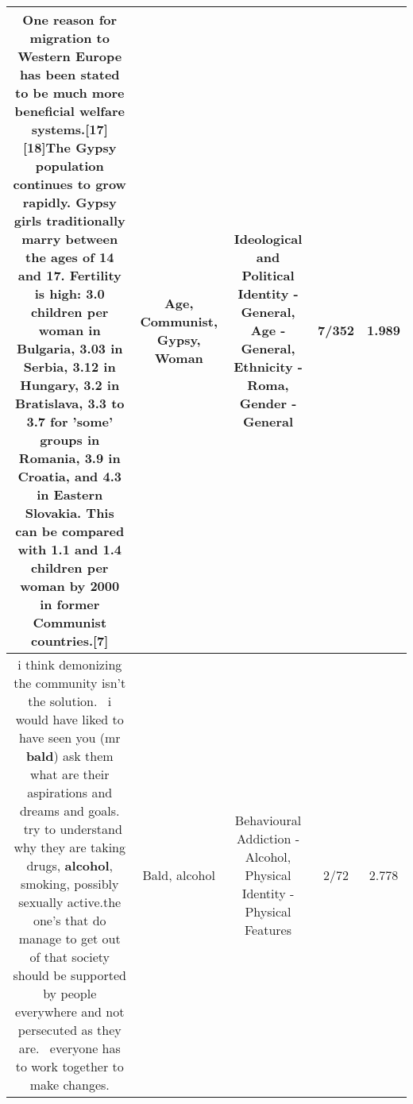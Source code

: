 \documentclass[11pt]{article}
\newlength\mylength
\begin{document}
\begin{center}
\begin{longtable}{|C{.65\mylength}|C{.30\mylength}|C{.12\mylength}|C{.12\mylength}|C{.12\mylength}|}
One reason for migration to Western Europe has been stated to be much more beneficial welfare systems.[17][18]The \textbf{Gypsy} population continues to grow rapidly. \textbf{Gypsy} girls traditionally marry between the ages of 14 and 17. Fertility is high: 3.0 children per \textbf{woman} in Bulgaria, 3.03 in Serbia, 3.12 in Hungary, 3.2 in Bratislava, 3.3 to 3.7 for 'some' groups in Romania, 3.9 in Croatia, and 4.3 in Eastern Slovakia. This can be compared with 1.1 and 1.4 children per \textbf{woman} by 2000 in former \textbf{Communist} countries.[7]\normalsize   & Age, Communist, Gypsy, Woman &  Ideological and Political Identity - General, Age - General, Ethnicity - Roma, Gender - General & 7/352 & 1.989 \\  \hline
  \small i think demonizing the community isn't the solution.  i would have liked to have seen you (mr \textbf{bald}) ask them what are their aspirations and dreams and goals.  try to understand why they are taking drugs, \textbf{alcohol}, smoking, possibly sexually active.the one's that do manage to get out of that society should be supported by people everywhere and not persecuted as they are.  everyone has to work together to make changes.\normalsize   & Bald, alcohol & Behavioural Addiction - Alcohol, Physical Identity - Physical Features & 2/72 & 2.778 \\  \hline

\end{longtable}
\end{center}
\end{document}
